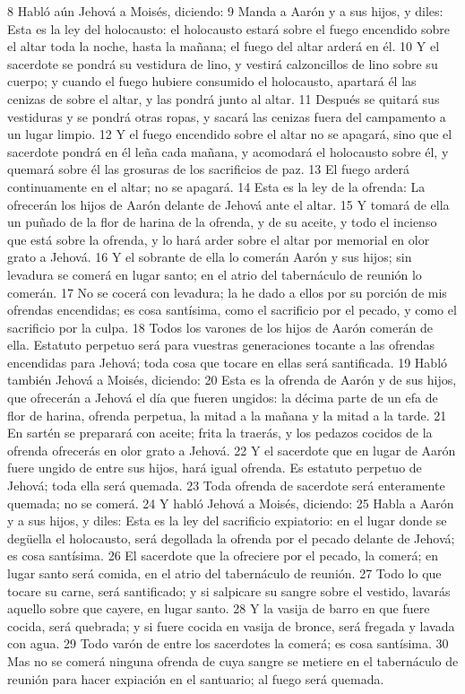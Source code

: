 8 Habló aún Jehová a Moisés, diciendo:
9 Manda a Aarón y a sus hijos, y diles: Esta es la ley del holocausto: el holocausto estará sobre el fuego encendido sobre el altar toda la noche, hasta la mañana; el fuego del altar arderá en él.
10 Y el sacerdote se pondrá su vestidura de lino, y vestirá calzoncillos de lino sobre su cuerpo; y cuando el fuego hubiere consumido el holocausto, apartará él las cenizas de sobre el altar, y las pondrá junto al altar.
11 Después se quitará sus vestiduras y se pondrá otras ropas, y sacará las cenizas fuera del campamento a un lugar limpio.
12 Y el fuego encendido sobre el altar no se apagará, sino que el sacerdote pondrá en él leña cada mañana, y acomodará el holocausto sobre él, y quemará sobre él las grosuras de los sacrificios de paz.
13 El fuego arderá continuamente en el altar; no se apagará.
14 Esta es la ley de la ofrenda: La ofrecerán los hijos de Aarón delante de Jehová ante el altar.
15 Y tomará de ella un puñado de la flor de harina de la ofrenda, y de su aceite, y todo el incienso que está sobre la ofrenda, y lo hará arder sobre el altar por memorial en olor grato a Jehová.
16 Y el sobrante de ella lo comerán Aarón y sus hijos; sin levadura se comerá en lugar santo; en el atrio del tabernáculo de reunión lo comerán.
17 No se cocerá con levadura; la he dado a ellos por su porción de mis ofrendas encendidas; es cosa santísima, como el sacrificio por el pecado, y como el sacrificio por la culpa.
18 Todos los varones de los hijos de Aarón comerán de ella. Estatuto perpetuo será para vuestras generaciones tocante a las ofrendas encendidas para Jehová; toda cosa que tocare en ellas será santificada.
19 Habló también Jehová a Moisés, diciendo:
20 Esta es la ofrenda de Aarón y de sus hijos, que ofrecerán a Jehová el día que fueren ungidos: la décima parte de un efa   de flor de harina, ofrenda perpetua, la mitad a la mañana y la mitad a la tarde.
21 En sartén se preparará con aceite; frita la traerás, y los pedazos cocidos de la ofrenda ofrecerás en olor grato a Jehová.
22 Y el sacerdote que en lugar de Aarón fuere ungido de entre sus hijos, hará igual ofrenda. Es estatuto perpetuo de Jehová; toda ella será quemada.
23 Toda ofrenda de sacerdote será enteramente quemada; no se comerá.
24 Y habló Jehová a Moisés, diciendo:
25 Habla a Aarón y a sus hijos, y diles: Esta es la ley del sacrificio expiatorio: en el lugar donde se degüella el holocausto, será degollada la ofrenda por el pecado delante de Jehová; es cosa santísima.
26 El sacerdote que la ofreciere por el pecado, la comerá; en lugar santo será comida, en el atrio del tabernáculo de reunión.
27 Todo lo que tocare su carne, será santificado; y si salpicare su sangre sobre el vestido, lavarás aquello sobre que cayere, en lugar santo.
28 Y la vasija de barro en que fuere cocida, será quebrada; y si fuere cocida en vasija de bronce, será fregada y lavada con agua.
29 Todo varón de entre los sacerdotes la comerá; es cosa santísima.
30 Mas no se comerá ninguna ofrenda de cuya sangre se metiere en el tabernáculo de reunión para hacer expiación en el santuario; al fuego será quemada.  

